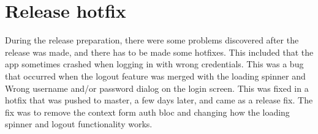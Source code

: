 \section{Release hotfix}
During the release preparation, there were some problems discovered after the release was made, and there has to be made some hotfixes. This included that the app sometimes crashed when logging in with wrong credentials. This was a bug that occurred when the logout feature was merged with the loading spinner and Wrong username and/or password dialog on the login screen. This was fixed in a hotfix that was pushed to master, a few days later, and came as a release fix. 
The fix was to remove the context form auth bloc and changing how the loading spinner and logout functionality works.
